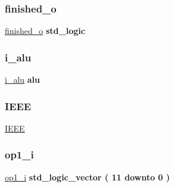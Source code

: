 \mbox{\label{classtb__alu_1_1sim_ab0632c3f5d92d282b6559777bd6dc018}} 
\subsubsection{\texorpdfstring{finished\+\_\+o}{finished\_o}}
{\footnotesize\ttfamily \hyperlink{classtb__alu_1_1sim_ab0632c3f5d92d282b6559777bd6dc018}{finished\+\_\+o} {\bfseries \textcolor{comment}{std\+\_\+logic}\textcolor{vhdlchar}{ }} \hspace{0.3cm}{\ttfamily [Signal]}}

\mbox{\label{classtb__alu_1_1sim_a9782fd33327dd4a14d723cbf74b8cea0}} 
\subsubsection{\texorpdfstring{i\+\_\+alu}{i\_alu}}
{\footnotesize\ttfamily \hyperlink{classtb__alu_1_1sim_a9782fd33327dd4a14d723cbf74b8cea0}{i\+\_\+alu} {\bfseries \textcolor{vhdlchar}{alu}\textcolor{vhdlchar}{ }} \hspace{0.3cm}{\ttfamily [Instantiation]}}

\mbox{\label{classtb__alu_1_1sim_ae4f03c286607f3181e16b9aa12d0c6d4}} 
\subsubsection{\texorpdfstring{I\+E\+EE}{IEEE}}
{\footnotesize\ttfamily \hyperlink{classtb__alu_1_1sim_ae4f03c286607f3181e16b9aa12d0c6d4}{I\+E\+EE}\hspace{0.3cm}{\ttfamily [Library]}}

\mbox{\label{classtb__alu_1_1sim_a8c60ff20331a9cd9b08c5a142fc84aa3}} 
\subsubsection{\texorpdfstring{op1\+\_\+i}{op1\_i}}
{\footnotesize\ttfamily \hyperlink{classtb__alu_1_1sim_a8c60ff20331a9cd9b08c5a142fc84aa3}{op1\+\_\+i} {\bfseries \textcolor{comment}{std\+\_\+logic\+\_\+vector}\textcolor{vhdlchar}{ }\textcolor{vhdlchar}{(}\textcolor{vhdlchar}{ }\textcolor{vhdlchar}{ } \textcolor{vhdldigit}{11} \textcolor{vhdlchar}{ }\textcolor{keywordflow}{downto}\textcolor{vhdlchar}{ }\textcolor{vhdlchar}{ } \textcolor{vhdldigit}{0} \textcolor{vhdlchar}{ }\textcolor{vhdlchar}{)}\textcolor{vhdlchar}{ }} \hspace{0.3cm}{\ttfamily [Signal]}}

